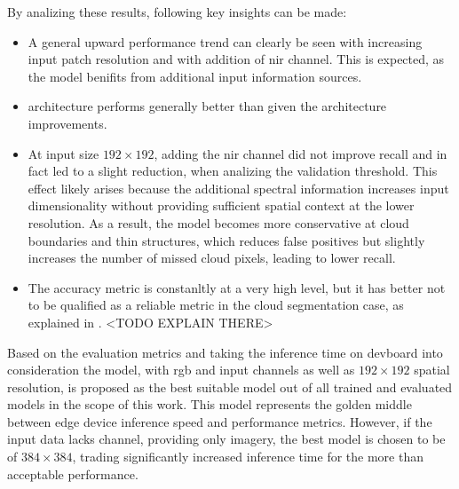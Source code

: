 {By analizing these results, following key insights can be made:
\begin{itemize}
    \item A general upward performance trend can clearly be seen with increasing input patch resolution and with addition of \gls{nir} channel.
    This is expected, as the model benifits from additional input information sources.
    \item {} architecture performs generally better than  given the architecture improvements.
    \item At input size \ensuremath{192\times192}, adding the \gls{nir} channel did not improve recall and in fact led to a slight reduction,
    when analizing the validation threshold. This effect likely arises because the additional spectral information increases input dimensionality without
    providing sufficient spatial context at the lower resolution. As a result, the model becomes more conservative at cloud boundaries and thin structures,
    which reduces false positives but slightly increases the number of missed cloud pixels, leading to lower recall.
    \item The accuracy metric is constanltly at a very high level, but it has better not to be qualified as a reliable metric in the
    cloud segmentation case, as explained in . <TODO EXPLAIN THERE>
\end{itemize}

Based on the evaluation metrics and taking the inference time on \gls{devboard} into consideration the  model,
with \gls{rgb} and  input channels as well as \ensuremath{192\times192} spatial resolution, is proposed as the best suitable model
out of all trained and evaluated models in the scope of this work. This model represents the golden middle between edge device inference speed
and performance metrics.
However, if the input data lacks  channel, providing only  imagery, the best model is chosen to be
 of \ensuremath{384\times384}, trading significantly increased inference time for the more than acceptable performance.

}